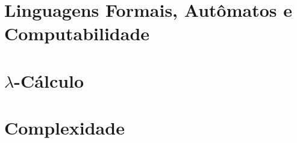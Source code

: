 \documentclass[lang=pt, citestyle=numeric-comp, bibstyle=authoryear, math=newtx, 11pt, fancy]{elegantbook}
\begin{document}
	\part{Linguagens Formais, Autômatos e Computabilidade}
	
	
	
	
	\part{\texorpdfstring{$\lambda$-Cálculo}{Lambda Cálculo}}
	
	\part{Complexidade}
	
	
	\printbibliography
	
\end{document}
